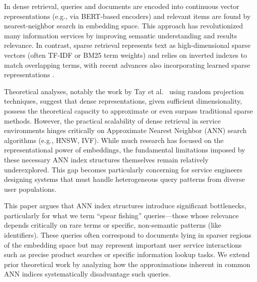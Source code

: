 \documentclass[conference,anonymous]{IEEEtran}
\begin{document}
In dense retrieval, queries and documents are encoded into continuous vector representations (e.g., via BERT-based encoders) and relevant items are found by nearest-neighbor search in embedding space. This approach has revolutionized many information services by improving semantic understanding and results relevance. In contrast, sparse retrieval represents text as high-dimensional sparse vectors (often TF-IDF or BM25 term weights) and relies on inverted indexes to match overlapping terms, with recent advances also incorporating learned sparse representations \cite{formal2021splade}.

Theoretical analyses, notably the work by Tay et al.\ \cite{tay2020sparse} using random projection techniques, suggest that dense representations, given sufficient dimensionality, possess the theoretical capacity to approximate or even surpass traditional sparse methods. However, the practical scalability of dense retrieval in service environments hinges critically on Approximate Nearest Neighbor (ANN) search algorithms (e.g., HNSW, IVF). While much research has focused on the representational power of embeddings, the fundamental limitations imposed by these necessary ANN index structures themselves remain relatively underexplored. This gap becomes particularly concerning for service engineers designing systems that must handle heterogeneous query patterns from diverse user populations.

This paper argues that ANN index structures introduce significant bottlenecks, particularly for what we term ``spear fishing'' queries—those whose relevance depends critically on rare terms or specific, non-semantic patterns (like identifiers). These queries often correspond to documents lying in sparser regions of the embedding space but may represent important user service interactions such as precise product searches or specific information lookup tasks. We extend prior theoretical work \cite{tay2020sparse, fan2022information} by analyzing how the approximations inherent in common ANN indices systematically disadvantage such queries.
\end{document}
